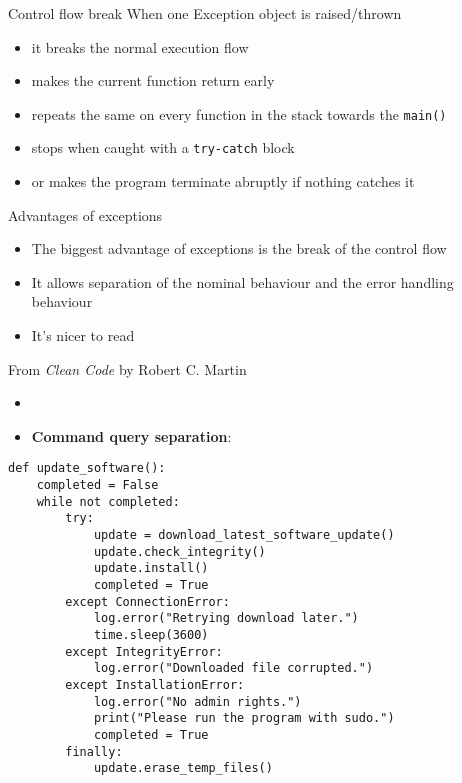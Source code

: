 \documentclass[aspectratio=169,14pt]{beamer}
\begin{document}
\begin{frame}{Control flow break}
When one Exception object is raised/thrown
\begin{itemize}
    \item it breaks the normal execution flow
    \item makes the current function return early
    \item repeats the same on every function in the stack towards the \texttt{main()}
    \item stops when caught with a \texttt{try-catch} block
    \item or makes the program terminate abruptly if nothing catches it
\end{itemize}
\end{frame}



\begin{frame}{Advantages of exceptions}
\begin{itemize}
    \item The biggest advantage of exceptions is the break of the control flow
    \item It allows separation of the nominal behaviour and the error handling behaviour
    \item It's nicer to read
\end{itemize}
\end{frame}



\begin{frame}{From \textit{Clean Code} by Robert C. Martin}
\begin{itemize}
    \item \textit{}
    \item \textbf{Command query separation}: \textit{}
\end{itemize}
\end{frame}



\begin{frame}[fragile]{}
\begin{lstlisting}[style=pythonstyle]
def update_software():
    completed = False
    while not completed:
        try:
            update = download_latest_software_update()
            update.check_integrity()
            update.install()
            completed = True
        except ConnectionError:
            log.error("Retrying download later.")
            time.sleep(3600)
        except IntegrityError:
            log.error("Downloaded file corrupted.")
        except InstallationError:
            log.error("No admin rights.")
            print("Please run the program with sudo.")
            completed = True
        finally:
            update.erase_temp_files()
\end{lstlisting}
\end{frame}
\end{document}
